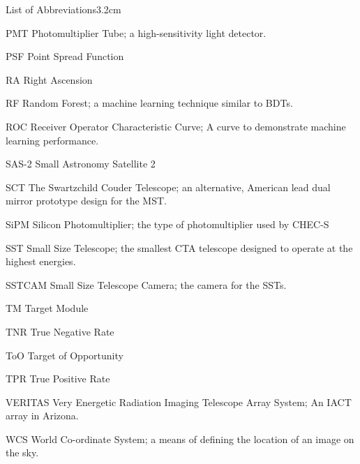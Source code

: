 \begin{mclistof}{List of Abbreviations}{3.2cm}
\item[PMT] Photomultiplier Tube; a high-sensitivity light detector.
\item[PSF] Point Spread Function
\item[RA] Right Ascension
\item[RF] Random Forest; a machine learning technique similar to BDTs.
\item[ROC] Receiver Operator Characteristic Curve; A curve to demonstrate machine learning performance. 
\item[SAS-2] Small Astronomy Satellite 2
\item[SCT] The Swartzchild Couder Telescope; an alternative, American lead dual mirror prototype design for the MST.
\item[SiPM] Silicon Photomultiplier; the type of photomultiplier used by CHEC-S
\item[SST] Small Size Telescope; the smallest CTA telescope designed to operate at the highest energies.
\item[SSTCAM] Small Size Telescope Camera; the camera for the SSTs.
\item[TM] Target Module
\item[TNR] True Negative Rate
\item[ToO] Target of Opportunity
\item[TPR] True Positive Rate
\item[VERITAS] Very Energetic Radiation Imaging Telescope Array System; An IACT array in Arizona.
\item[WCS] World Co-ordinate System; a means of defining the location of an image on the sky.
\end{mclistof} 
